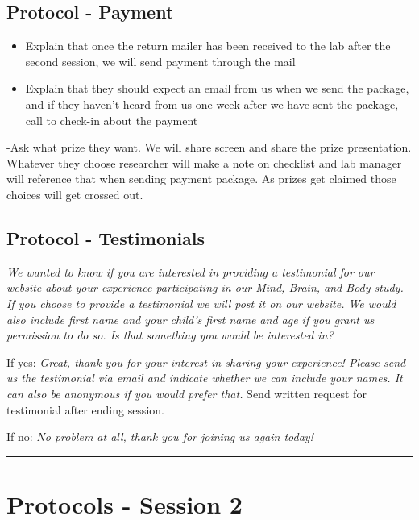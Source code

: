 \documentclass[]{book}
\begin{document}
\hypertarget{protocol---payment-4}{%
\subsection{Protocol - Payment}\label{protocol---payment-4}}

\begin{itemize}
\item
  Explain that once the return mailer has been received to the lab after the second session, we will send payment through the mail
\item
  Explain that they should expect an email from us when we send the package, and if they haven't heard from us one week after we have sent the package, call to check-in about the payment
\end{itemize}

-Ask what prize they want. We will share screen and share the prize presentation. Whatever they choose researcher will make a note on checklist and lab manager will reference that when sending payment package. As prizes get claimed those choices will get crossed out.

\hypertarget{protocol---testimonials-2}{%
\subsection{Protocol - Testimonials}\label{protocol---testimonials-2}}

\emph{We wanted to know if you are interested in providing a testimonial for our website about your experience participating in our Mind, Brain, and Body study. If you choose to provide a testimonial we will post it on our website. We would also include first name and your child's first name and age if you grant us permission to do so. Is that something you would be interested in?}

If yes: \emph{Great, thank you for your interest in sharing your experience! Please send us the testimonial via email and indicate whether we can include your names. It can also be anonymous if you would prefer that.} Send written request for testimonial after ending session.

If no: \emph{No problem at all, thank you for joining us again today!}

\begin{center}\rule{0.5\linewidth}{0.5pt}\end{center}

\hypertarget{protocols---session-2-3}{%
\section{Protocols - Session 2}\label{protocols---session-2-3}}
\end{document}
